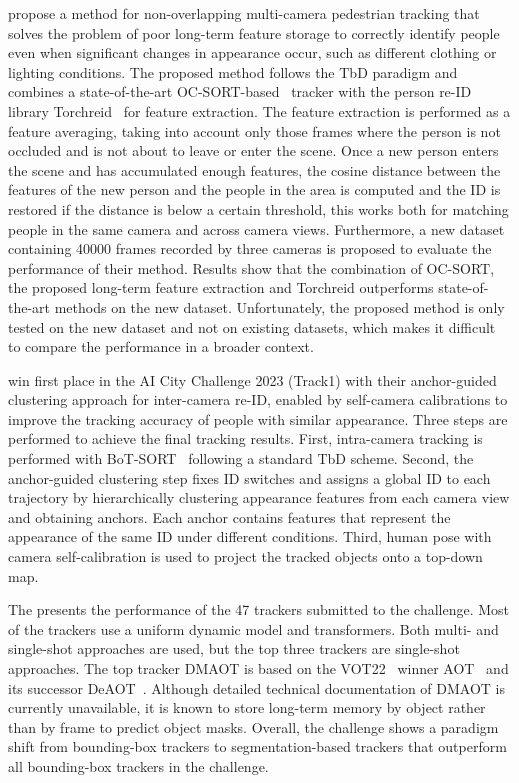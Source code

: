 \citeauthor{Huang23a} propose a method for non-overlapping multi-camera pedestrian tracking that solves the problem of poor long-term feature storage to correctly identify people even when significant changes in appearance occur, such as different clothing or lighting conditions. The proposed method follows the TbD paradigm and combines a state-of-the-art OC-SORT-based~\cite{Cao23} tracker with the person re-ID library Torchreid~\cite{Zhou19} for feature extraction. The feature extraction is performed as a feature averaging, taking into account only those frames where the person is not occluded and is not about to leave or enter the scene. Once a new person enters the scene and has accumulated enough features, the cosine distance between the features of the new person and the people in the area is computed and the ID is restored if the distance is below a certain threshold, this works both for matching people in the same camera and across camera views. Furthermore, a new dataset containing 40000 frames recorded by three cameras is proposed to evaluate the performance of their method. Results show that the combination of OC-SORT, the proposed long-term feature extraction and Torchreid outperforms state-of-the-art methods on the new dataset. Unfortunately, the proposed method is only tested on the new dataset and not on existing datasets, which makes it difficult to compare the performance in a broader context.

\textcite{Huang23b} win first place in the AI City Challenge 2023 (Track1) with their anchor-guided clustering approach for inter-camera re-ID, enabled by self-camera calibrations to improve the tracking accuracy of people with similar appearance. Three steps are performed to achieve the final tracking results. First, intra-camera tracking is performed with BoT-SORT~\cite{Aharon22} following a standard TbD scheme. Second, the anchor-guided clustering step fixes ID switches and assigns a global ID to each trajectory by hierarchically clustering appearance features from each camera view and obtaining anchors. Each anchor contains features that represent the appearance of the same ID under different conditions. Third, human pose with camera self-calibration is used to project the tracked objects onto a top-down map.

The  presents the performance of the 47 trackers submitted to the challenge. Most of the trackers use a uniform dynamic model and transformers. Both multi- and single-shot approaches are used, but the top three trackers are single-shot approaches. The top tracker DMAOT is based on the VOT22~\cite{Kristan22} winner AOT~\cite{Yang21} and its successor DeAOT~\cite{Yang22b}. Although detailed technical documentation of DMAOT is currently unavailable, it is known to store long-term memory by object rather than by frame to predict object masks. Overall, the challenge shows a paradigm shift from bounding-box trackers to segmentation-based trackers that outperform all bounding-box trackers in the challenge.


